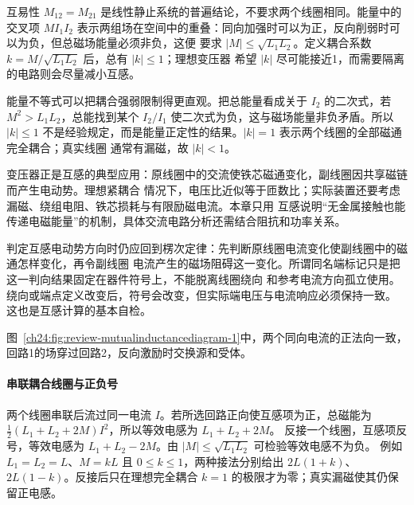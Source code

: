 {互易性 $M_{12}=M_{21}$ 是线性静止系统的普遍结论，不要求两个线圈相同。能量中的交叉项 $MI_1I_2$
表示两组场在空间中的重叠：同向加强时可以为正，反向削弱时可以为负，但总磁场能量必须非负，这便
要求 $|M|\le\sqrt{L_1L_2}$。定义耦合系数 $k=M/\sqrt{L_1L_2}$ 后，总有 $|k|\le1$；理想变压器
希望 $|k|$ 尽可能接近1，而需要隔离的电路则会尽量减小互感。

能量不等式可以把耦合强弱限制得更直观。把总能量看成关于 $I_2$ 的二次式，若
$M^2>L_1L_2$，总能找到某个 $I_2/I_1$ 使二次式为负，这与磁场能量非负矛盾。所以
$|k|\le1$ 不是经验规定，而是能量正定性的结果。$|k|=1$ 表示两个线圈的全部磁通完全耦合；真实线圈
通常有漏磁，故 $|k|<1$。

变压器正是互感的典型应用：原线圈中的交流使铁芯磁通变化，副线圈因共享磁链而产生电动势。理想紧耦合
情况下，电压比近似等于匝数比；实际装置还要考虑漏磁、绕组电阻、铁芯损耗与有限励磁电流。本章只用
互感说明“无金属接触也能传递电磁能量”的机制，具体交流电路分析还需结合阻抗和功率关系。

判定互感电动势方向时仍应回到楞次定律：先判断原线圈电流变化使副线圈中的磁通怎样变化，再令副线圈
电流产生的磁场阻碍这一变化。所谓同名端标记只是把这一判向结果固定在器件符号上，不能脱离线圈绕向
和参考电流方向孤立使用。
绕向或端点定义改变后，符号会改变，但实际端电压与电流响应必须保持一致。
这也是互感计算的基本自检。

图~\ref{ch24:fig:review-mutualinductancediagram-1}中，两个同向电流的正法向一致，回路1的场穿过回路2，反向激励时交换源和受体。
\par\noindent\begin{minipage}{\linewidth}
\mutualInductanceDiagram
{}
\end{minipage}\par\medskip


\paragraph{串联耦合线圈与正负号}
两个线圈串联后流过同一电流 $I$。若所选回路正向使互感项为正，总磁能为
$\frac12(L_1+L_2+2M)I^2$，所以等效电感为 $L_1+L_2+2M$。
反接一个线圈，互感项反号，等效电感为 $L_1+L_2-2M$。由 $|M|\le\sqrt{L_1L_2}$ 可检验等效电感不为负。
例如 $L_1=L_2=L$、$M=kL$ 且 $0\le k\le1$，两种接法分别给出 $2L(1+k)$、$2L(1-k)$。反接后只在理想完全耦合 $k=1$ 的极限才为零；真实漏磁使其仍保留正电感。



}
